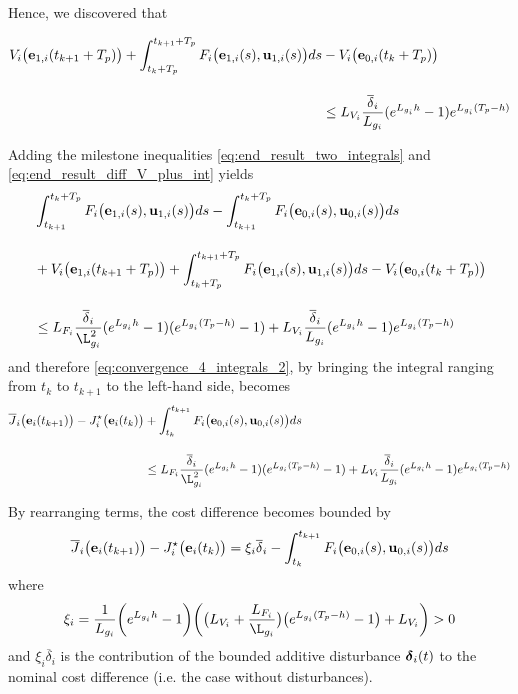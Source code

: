 Hence, we discovered that\\[1.0ex]
\begin{bw_box}
\begin{align}
  V_i\big(\bm{\mathbf{e}}_{1,i}(t_{k+1} + T_p)\big)
  + \int_{t_k + T_p}^{t_{k+1} + T_p} F_i\big(\bm{\mathbf{e}}_{1,i}(s), \bm{\mathbf{u}}_{1,i}(s)\big) ds
  &- V_i\big(\bm{\mathbf{e}}_{0,i}(t_k + T_p)\big) \\[2.5ex]
  &\leq L_{V_i}\dfrac{\overline{\delta}_i}{L_{g_i}} (e^{L_{g_i}h} - 1) e^{L_{g_i} (T_p - h)}
  \label{eq:end_result_diff_V_plus_int}
\end{align}
\end{bw_box}

Adding the milestone inequalities \eqref{eq:end_result_two_integrals} and
\eqref{eq:end_result_diff_V_plus_int} yields
\begin{alignat}{2}
  &\int_{t_{k+1}}^{t_k + T_p} F_i \big(\vect{e}_{1,i}(s), \vect{u}_{1,i} (s)\big) d s
  - \int_{t_{k+1}}^{t_k + T_p} F_i \big(\vect{e}_{0,i}(s), \vect{u}_{0,i} (s)\big) d s \\[2.5ex]
  &+ V_i\big(\vect{e}_{1,i}(t_{k+1} + T_p)\big)
  + \int_{t_k + T_p}^{t_{k+1} + T_p} F_i\big(\vect{e}_{1,i}(s), \vect{u}_{1,i}(s)\big) ds
  - V_i\big(\vect{e}_{0,i}(t_k + T_p)\big) \\[2.5ex]
  &\leq L_{F_i} \dfrac{\overline{\delta}_i}{\L_{g_i}^2} (e^{L_{g_i} h} - 1) (e^{L_{g_i}(T_p-h)} - 1)
  + L_{V_i}\dfrac{\overline{\delta}_i}{L_{g_i}} (e^{L_{g_i}h} - 1) e^{L_{g_i} (T_p - h)}
\end{alignat}
and therefore \eqref{eq:convergence_4_integrals_2}, by bringing the integral
ranging from $t_k$ to $t_{k+1}$ to the left-hand side, becomes
\begin{align}
  \overline{J}_i\big(\vect{e}_i(t_{k+1})\big)
    - J_i^{\star}\big(\vect{e}_i(t_k)\big)
    &+ \int_{t_k}^{t_{k+1}} F_i \big(\vect{e}_{0,i}(s), \vect{u}_{0,i} (s)\big) d s \\[2.5ex]
    &\leq L_{F_i} \dfrac{\overline{\delta}_i}{\L_{g_i}^2} (e^{L_{g_i} h} - 1) (e^{L_{g_i}(T_p-h)} - 1)
  + L_{V_i}\dfrac{\overline{\delta}_i}{L_{g_i}} (e^{L_{g_i}h} - 1) e^{L_{g_i} (T_p - h)}
\end{align}

By rearranging terms, the cost difference becomes bounded by
\begin{align}
  \overline{J}_i\big(\bm{\mathbf{e}}_i(t_{k+1})\big) - J_i^{\star}\big(\bm{\mathbf{e}}_i(t_k)\big)
    = \xi_i \overline{\delta}_i -\int_{t_k}^{t_{k+1}} F_i \big(\bm{\mathbf{e}}_{0,i}(s), \bm{\mathbf{u}}_{0,i} (s)\big) d s
\end{align}
where
\begin{align}
  \xi_i =\dfrac{1}{L_{g_i}} \bigg(e^{L_{g_i}h} - 1\bigg)
    \bigg(\big(L_{V_i} + \dfrac{L_{F_i}}{\L_{g_i}}\big) \big(e^{L_{g_i}(T_p-h)}-1\big) + L_{V_i} \bigg) > 0
\end{align}
and $\xi_i \overline{\delta}_i$ is the contribution of the bounded additive
disturbance $\bm{\mathbf{\delta}}_i(t)$ to the nominal cost difference
(i.e. the case without disturbances).\\[1ex]

